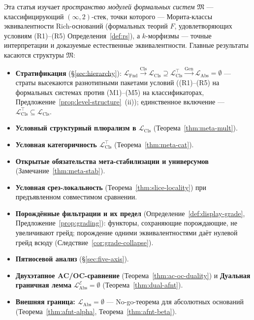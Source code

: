 \documentclass[11pt]{article}
\theoremstyle{plain}
\theoremstyle{definition}
\newcommand{\fM}{\mathfrak{M}}
\newcommand{\LFnd}{\mathcal{L}_{\mathrm{Fnd}}}
\newcommand{\LCls}{\mathcal{L}_{\mathrm{Cls}}}
\newcommand{\LClsMax}{\mathcal{L}_{\mathrm{Cls}}^{\top}}
\newcommand{\LAbs}{\mathcal{L}_{\mathrm{Abs}}}
\newcommand{\cE}{\mathcal{E}}
\newcommand{\LAbsE}{\LAbs^{\cE}}
\begin{document}
Эта статья изучает \emph{пространство модулей формальных систем} $\fM$ — классифицирующий $(\infty, 2)$-стек, точки которого — Морита-классы эквивалентности Rich-оснований (формальных теорий $F$, удовлетворяющих условиям (R1)--(R5) Определения~\ref{def:rs}), а $k$-морфизмы — точные интерпретации и доказуемые естественные эквивалентности. Главные результаты касаются структуры $\fM$:
\begin{itemize}
\item \textbf{Стратификация} (\S\ref{sec:hierarchy}): $\LFnd \xrightarrow{\mathrm{Cls}} \LCls \supseteq \LClsMax \xrightarrow{\mathrm{Gen}} \LAbs = \emptyset$ --- страты высекаются разнотипными пакетами условий ((R1)--(R5) на формальных системах против (M1)--(M5) на классификаторах, Предложение~\ref{prop:level-structure}~(ii)); единственное включение --- $\LClsMax \subseteq \LCls$.
\item \textbf{Условный структурный плюрализм в $\LCls$} (Теорема~\ref{thm:meta-mult}).
\item \textbf{Условная категоричность $\LClsMax$} (Теорема~\ref{thm:meta-cat}).
\item \textbf{Открытые обязательства мета-стабилизации и универсумов} (Замечание~\ref{thm:meta-stab}).
\item \textbf{Условная срез-локальность} (Теорема~\ref{thm:slice-locality}) при предъявленном совместимом сравнении.
\item \textbf{Порождённые фильтрации и их предел} (Определение~\ref{def:display-grade}, Предложение~\ref{prop:grading}): функторы, сохраняющие порождающие, не увеличивают грейд; порождение одними эквивалентностями даёт нулевой грейд всюду (Следствие~\ref{cor:grade-collapse}).
\item \textbf{Пятиосевой анализ} (\S\ref{sec:five-axis}).
\item \textbf{Двухэтапное AC/OC-сравнение} (Теорема~\ref{thm:ac-oc-duality}) и \textbf{Дуальная граничная лемма} $\LAbsE = \emptyset$ (Теорема~\ref{thm:dual-afnt}).
\item \textbf{Внешняя граница: $\LAbs = \emptyset$} --- No-go-теорема для абсолютных оснований (Теорема~\ref{thm:afnt-alpha}, Теорема~\ref{thm:afnt-beta}).
\end{itemize}
\end{document}
